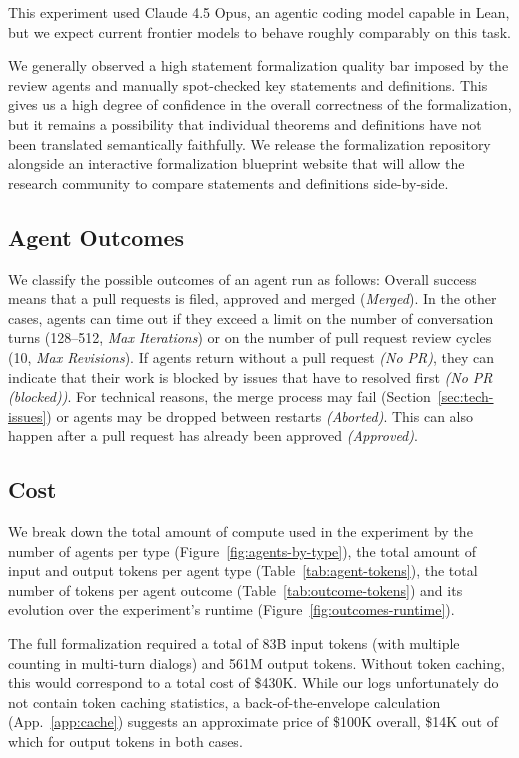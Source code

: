 \documentclass[]{fairmeta}
\begin{document}
This experiment used Claude 4.5 Opus, an agentic coding model capable in Lean, but we expect current frontier models to behave roughly comparably on this task.

We generally observed a high statement formalization quality bar imposed by the review agents and manually spot-checked key statements and definitions. This gives us a high degree of confidence in the overall correctness of the formalization, but it remains a possibility that individual theorems and definitions have not been translated semantically faithfully. We release the formalization repository alongside an interactive formalization blueprint website that will allow the research community to compare statements and definitions side-by-side. 

\subsection{Agent Outcomes}
\label{sec:outcomes}
We classify the possible outcomes of an agent run as follows: 
Overall success means that a pull requests is filed, approved and merged (\emph{Merged}).
In the other cases, agents can time out if they exceed a limit on the number of conversation turns (128--512, \emph{Max Iterations}) or on the number of pull request review cycles (10, \emph{Max Revisions}).
If agents return without a pull request \emph{(No PR)}, they can indicate that their work is blocked by issues that have to resolved first \emph{(No PR (blocked))}.
For technical reasons, the merge process may fail (Section~\ref{sec:tech-issues}) or agents may be dropped between restarts \emph{(Aborted)}.
This can also happen after a pull request has already been approved \emph{(Approved)}.

\subsection{Cost}


We break down the total amount of compute used in the experiment by the number of agents per type (Figure~\ref{fig:agents-by-type}),
the total amount of input and output tokens per agent type (Table~\ref{tab:agent-tokens}),
the total number of tokens per agent outcome (Table~\ref{tab:outcome-tokens}) and its evolution over the experiment's runtime (Figure~\ref{fig:outcomes-runtime}).

The full formalization required a total of 83B input tokens (with multiple counting in multi-turn dialogs) and 561M output tokens. Without token caching, this would correspond to a total cost of \$430K. While our logs unfortunately do not contain token caching statistics, a back-of-the-envelope calculation (App.~\ref{app:cache}) suggests an approximate price of \$100K overall, \$14K out of which for output tokens in both cases.
\end{document}
